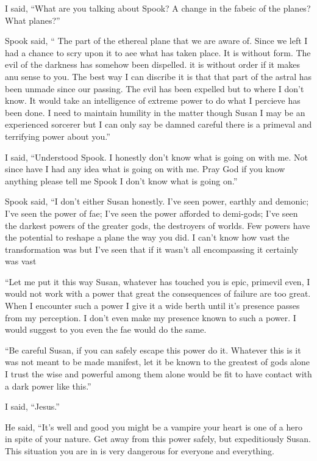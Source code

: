 I said, ``What are you talking about Spook? A change in the fabeic of the planes? What planes?''

Spook said, `` The part of the ethereal plane that we are aware of. Since we left I had a chance to scry upon it to aee what has taken place. It is without form. The evil of the darkness has somehow been dispelled. it is without order if it makes anu sense to you. The best way I can discribe it is that that part of the astral has been unmade since our passing. The evil has been expelled but to where I don't know. It would take an intelligence of extreme power to do what I percieve has been done. I need to maintain humility in the matter though Susan I may be an experienced sorcerer but I can only say be damned careful there is a primeval and terrifying power about you.''

I said, ``Understood Spook. I honestly don't know what is going on with me. Not since \chichenitza* have I had any idea what is going on with me. Pray God if you know anything please tell me Spook I don't know what is going on.''

Spook said, ``I don't either Susan honestly. I've seen power, earthly and demonic; I've seen the power of fae; I've seen the power afforded to demi-gods; I've seen the darkest powers of the greater gods, the destroyers of worlds. Few powers have the potential to reshape a plane the way you did. I can't know how vast the transformation was but I've seen that if it wasn't all encompassing it certainly was vast

``Let me put it this way Susan, whatever has touched you is epic, primevil even, I would not work with a power that great the consequences of failure are too great. When I encounter such a power I give it a wide berth until it's presence passes from my perception. I don't even make my presence known to such a power. I would suggest to you even the fae would do the same.

``Be careful Susan, if you can safely escape this power do it. Whatever this is it was not meant to be made manifest, let it be known to the greatest of gods alone I trust the wise and powerful among them alone would be fit to have contact with a dark power like this.''

I said, ``Jesus.''

He said, ``It's well and good you might be a vampire your heart is one of a hero in spite of your nature. Get away from this power safely, but expeditiously Susan. This situation you are in is very dangerous for everyone and everything.


